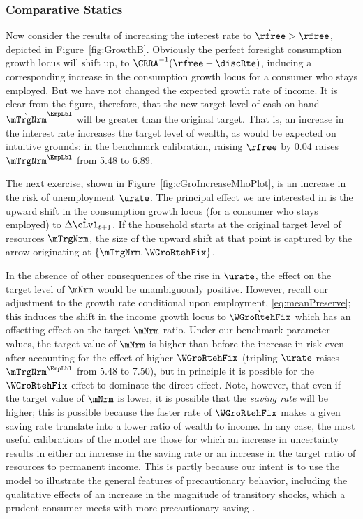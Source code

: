 \documentclass{econark}
\begin{document}

\subsubsection{Comparative Statics}

Now consider the results of increasing the interest rate to
$\grave{\rfree}>\rfree$, depicted in Figure~\ref{fig:GrowthB}.  Obviously the perfect foresight consumption
growth locus will shift up, to $\CRRA^{-1}(\grave{\rfree}-\discRte)$,
inducing a corresponding increase in the consumption growth
locus for a consumer who stays employed.  But we have not changed the expected growth rate of income.
It is clear from the figure, therefore, that the new target level of
cash-on-hand $\grave{\mTrgNrm}^{\EmpLbl}$ will be greater than the original target.
That is, an increase in the interest rate increases the target level
of wealth, as would be expected on intuitive grounds: in the benchmark calibration, raising $\rfree$ by 0.04 raises $\mTrgNrm^{\EmpLbl}$ from 5.48 to 6.89.

The next exercise, shown in Figure~\ref{fig:cGroIncreaseMhoPlot}, is an increase in the risk of unemployment $\urate$.
The principal effect we are interested in is the upward shift in the
consumption growth locus (for a consumer who stays employed) to $\Delta \grave{\cLvl}_{t+1}$.  If the
household starts at the original target level of resources
$\mTrgNrm$, the size of the upward shift at that point is captured by the
arrow originating at $\{\mTrgNrm,\WGroRtehFix\}$.  

In the absence of other consequences of the rise in $\urate$, the
effect on the target level of $\mNrm$ would be unambiguously positive.
However, recall our adjustment to the growth rate conditional upon
employment, \eqref{eq:meanPreserve}; this induces the shift in the
income growth locus to $\grave{\WGroRtehFix}$ which has an offsetting effect
on the target $\mNrm$ ratio.  Under our benchmark parameter values,
the target value of $\mNrm$ is higher than before the increase in risk
even after accounting for the effect of higher $\WGroRtehFix$ (tripling $\urate$ raises $\mTrgNrm^{\EmpLbl}$ from 5.48 to 7.50), but in
principle it is possible for the $\WGroRtehFix$ effect to dominate the direct
effect.  Note, however, that even if the target value of $\mNrm$ is
lower, it is possible that the {\it saving rate} will be higher; this
is possible because the faster rate of $\WGroRtehFix$ makes a given saving
rate translate into a lower ratio of wealth to income.  In any case,
the most useful calibrations of the model are those for
which an increase in uncertainty results in either an increase in the
saving rate or an increase in the target ratio of resources to
permanent income.  This is partly because our intent is to use the
model to illustrate the general features of precautionary behavior,
including the qualitative effects of an increase in the magnitude of
transitory shocks, which a prudent consumer meets with more precautionary
saving \citep{kimball:smallandlarge}.
\end{document}

